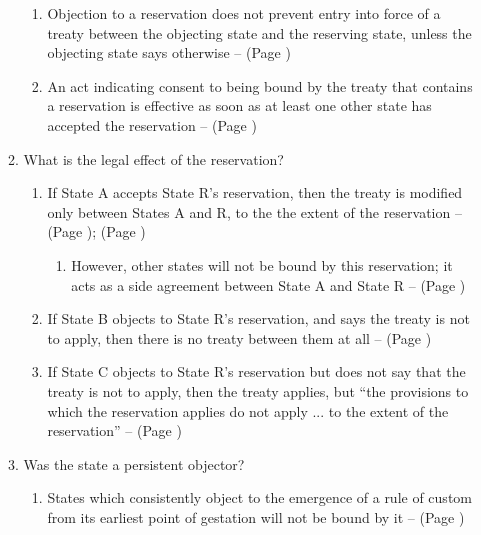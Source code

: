 \begin{enumerate}
\begin{enumerate}
\begin{enumerate}
            \item Objection to a reservation does not prevent entry into force of a treaty between the objecting state and the reserving state, unless the objecting state says otherwise --  (Page \pageref{VCLT Art 20})
            \item An act indicating consent to being bound by the treaty that contains a reservation is effective as soon as at least one other state has accepted the reservation --  (Page \pageref{VCLT Art 20})
        \end{enumerate}
        \item What is the legal effect of the reservation?
        \begin{enumerate}
            \item If State A accepts State R's reservation, then the treaty is modified only between States A and R, to the the extent of the reservation --  (Page \pageref{VCLT Art 21});  (Page \pageref{case:India v CCDM})
            \begin{enumerate}
                \item However, other states will not be bound by this reservation; it acts as a side agreement between State A and State R --  (Page \pageref{VCLT Art 21})
            \end{enumerate}
            \item If State B objects to State R's reservation, and says the treaty is not to apply, then there is no treaty between them at all --  (Page \pageref{VCLT Art 20})
            \item If State C objects to State R's reservation but does not say that the treaty is not to apply, then the treaty applies, but “the provisions to which the reservation applies do not apply ... to the extent of the reservation” --  (Page \pageref{VCLT Art 21})
        \end{enumerate}
        \item Was the state a persistent objector?
        \begin{enumerate}
            \item States which consistently object to the emergence of a rule of custom from its earliest point of gestation will not be bound by it --  (Page \pageref{case:UK v Norway Fisheries})

\end{enumerate}
\end{enumerate}
\end{enumerate}

